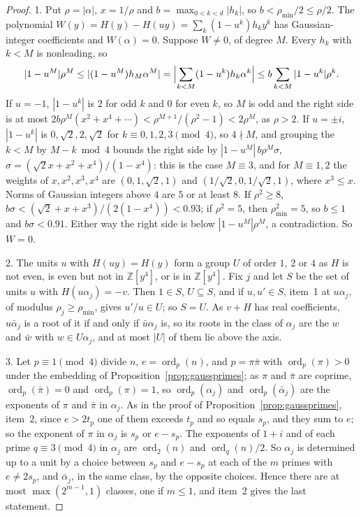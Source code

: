 \documentclass[11pt]{article}
\begin{document}
\begin{proof}
1.  Put $\rho=|\alpha|$, $x=1/\rho$ and $b=\max_{0<k<d}|h_k|$, so
$b<\rho_{\min}/2\le\rho/2$.  The polynomial
$W(y)=H(y)-H(uy)=\sum_k(1-u^k)h_ky^k$ has Gaussian-integer coefficients and
$W(\alpha)=0$.  Suppose $W\ne0$, of degree $M$.  Every $h_k$ with $k<M$ is
nonleading, so
\[
  |1-u^M|\rho^M\le|(1-u^M)h_M\alpha^M|
  =\Bigl|\sum_{k<M}(1-u^k)h_k\alpha^k\Bigr|
  \le b\sum_{k<M}|1-u^k|\rho^k.
\]
If $u=-1$, $|1-u^k|$ is $2$ for odd $k$ and $0$ for even $k$, so $M$ is
odd and the right side is at most
$2b\rho^M(x^2+x^4+\cdots)<\rho^{M+1}/(\rho^2-1)<2\rho^M$, as $\rho>2$.  If $u=\pm i$, $|1-u^k|$ is
$0,\sqrt2,2,\sqrt2$ for $k\equiv0,1,2,3\pmod4$, so $4\nmid M$, and grouping
the $k<M$ by $M-k\bmod4$ bounds the right side by
$|1-u^M|\,b\rho^M\sigma$, $\sigma=(\sqrt2x+x^2+x^4)/(1-x^4)$: this is the
case $M\equiv3$, and for $M\equiv1,2$ the weights of $x,x^2,x^3,x^4$ are
$(0,1,\sqrt2,1)$ and $(1/\sqrt2,0,1/\sqrt2,1)$, where $x^3\le x$.  Norms of
Gaussian integers above $4$ are $5$ or at least $8$.  If $\rho^2\ge8$,
$b\sigma<(\sqrt2+x+x^3)/(2(1-x^4))<0.93$; if $\rho^2=5$, then
$\rho_{\min}^2=5$, so $b\le1$ and $b\sigma<0.91$.  Either way the right side
is below $|1-u^M|\rho^M$, a contradiction.  So $W=0$.

2.  The units $u$ with $H(uy)=H(y)$ form a group $U$ of order $1$, $2$ or
$4$ as $H$ is not even, is even but not in $\mathbb Z[y^4]$, or is in
$\mathbb Z[y^4]$.  Fix $j$ and let $S$ be the set of units $u$ with
$H(u\alpha_j)=-v$.  Then $1\in S$, $U\subseteq S$, and if $u,u'\in S$,
item~1 at $u\alpha_j$, of modulus $\rho_j\ge\rho_{\min}$, gives $u'/u\in U$;
so $S=U$.  As $v+H$ has real coefficients, $u\bar\alpha_j$ is a root of it
if and only if $\bar u\alpha_j$ is, so its roots in the class of $\alpha_j$
are the $w$ and $\bar w$ with $w\in U\alpha_j$, and at most $|U|$ of them
lie above the axis.

3.  Let $p\equiv1\pmod4$ divide $n$, $e=\operatorname{ord}_p(n)$, and
$p=\pi\bar\pi$ with $\operatorname{ord}_p(\pi)>0$ under the embedding of
Proposition~\ref{prop:gaussprimes}; as $\pi$ and $\bar\pi$ are coprime,
$\operatorname{ord}_p(\bar\pi)=0$ and $\operatorname{ord}_p(\pi)=1$, so $\operatorname{ord}_p(\alpha_j)$ and $\operatorname{ord}_p(\bar\alpha_j)$
are the exponents of $\pi$ and $\bar\pi$ in $\alpha_j$.  As in the proof of
Proposition~\ref{prop:gaussprimes}, item~2, since $e>2t_p$ one of them
exceeds $t_p$ and so equals $s_p$, and they sum to $e$; so the exponent of
$\pi$ in $\alpha_j$ is $s_p$ or $e-s_p$.  The exponents of $1+i$ and of each
prime $q\equiv3\pmod4$ in $\alpha_j$ are $\operatorname{ord}_2(n)$ and
$\operatorname{ord}_q(n)/2$.  So $\alpha_j$ is determined up to a unit by a
choice between $s_p$ and $e-s_p$ at each of the $m$ primes with
$e\ne2s_p$, and $\bar\alpha_j$, in the same class, by the opposite choices.
Hence there are at most $\max(2^{m-1},1)$ classes, one if $m\le1$, and
item~2 gives the last statement.
\end{proof}
\end{document}
